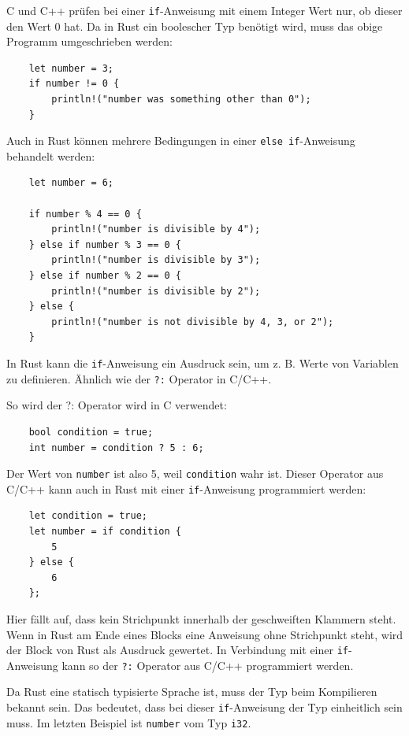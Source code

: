 C und C++ prüfen bei einer \verb"if"-Anweisung mit einem Integer Wert nur, ob dieser den Wert 0 hat. Da in Rust ein boolescher Typ benötigt wird, muss das obige Programm umgeschrieben werden:

\begin{lstlisting}
    let number = 3;
    if number != 0 {
        println!("number was something other than 0");
    }
\end{lstlisting}

Auch in Rust können mehrere Bedingungen in einer \verb"else if"-Anweisung behandelt werden:

\begin{lstlisting}
    let number = 6;

    if number % 4 == 0 {
        println!("number is divisible by 4");
    } else if number % 3 == 0 {
        println!("number is divisible by 3");
    } else if number % 2 == 0 {
        println!("number is divisible by 2");
    } else {
        println!("number is not divisible by 4, 3, or 2");
    }
\end{lstlisting}

In Rust kann die \verb"if"-Anweisung ein Ausdruck sein, um z. B. Werte von Variablen zu definieren. Ähnlich wie der \verb"?:" Operator in C/C++.

So wird der ?: Operator wird in C verwendet:

\begin{lstlisting}
    bool condition = true;
    int number = condition ? 5 : 6;
\end{lstlisting}

Der Wert von \verb"number" ist also 5, weil \verb"condition" wahr ist. Dieser Operator aus C/C++ kann auch in Rust mit einer \verb"if"-Anweisung programmiert werden:

\begin{lstlisting}
    let condition = true;
    let number = if condition {
        5
    } else {
        6
    };
\end{lstlisting}

Hier fällt auf, dass kein Strichpunkt innerhalb der geschweiften Klammern steht. Wenn in Rust am Ende eines Blocks eine Anweisung ohne Strichpunkt steht, wird der Block von Rust als Ausdruck gewertet. In Verbindung mit einer \verb"if"-Anweisung kann so der \verb"?:" Operator aus C/C++ programmiert werden.

Da Rust eine statisch typisierte Sprache ist, muss der Typ beim Kompilieren bekannt sein. Das bedeutet, dass bei dieser \verb"if"-Anweisung der Typ einheitlich sein muss. Im letzten Beispiel ist \verb"number" vom Typ \verb"i32".

